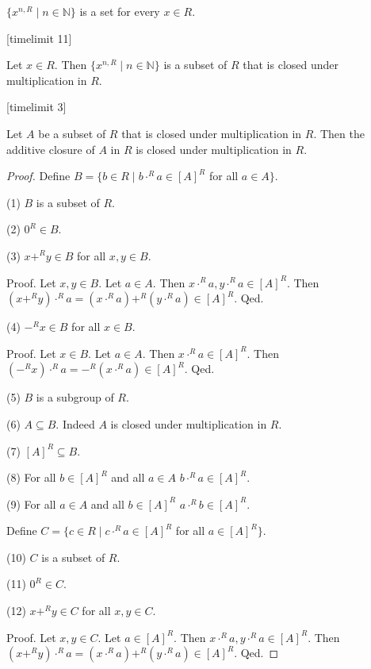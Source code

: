 \documentclass[english,11pt]{article}
\newcommand{\powers}[2]{\{{#1}^{n,#2} \mid n \in \mathbb{N}\}}
\begin{document}
\begin{forthel}
\begin{lemma} $\powers{x}{R}$ is a set for every $x \in R$.
\end{lemma}

[timelimit 11]
\begin{lemma} Let $x \in R$. Then
$\powers{x}{R}$ is a subset of $R$ that is closed under multiplication in $R$.
\end{lemma}
[timelimit 3]

\begin{lemma}
Let $A$ be a subset of $R$ that is closed under multiplication in $R$.
Then the additive closure of $A$ in $R$ is closed under multiplication in $R$.
\end{lemma}

\begin{proof}
Define $B = \{b \in R \mid b \cdot^{R} a \in [A]^{R}$ for all $a \in A\}$.

(1) $B$ is a subset of $R$.

(2) $0^{R} \in B$.

(3) $x +^{R} y \in B$ for all $x,y \in B$.

Proof.
Let $x,y \in B$.
Let $a \in A$. Then $x \cdot^{R} a, y \cdot^{R} a \in [A]^{R}$.
Then $(x +^{R} y) \cdot^{R} a = (x \cdot^{R} a) +^{R} (y \cdot^{R} a) \in [A]^{R}$.
Qed.

(4) $-^{R} x \in B$ for all $x \in B$.

Proof.
Let $x \in B$.
Let $a \in A$. Then $x \cdot^{R} a \in [A]^{R}$.
Then $(-^{R} x) \cdot^{R} a = -^{R} (x\cdot^{R} a) \in [A]^{R}$.
Qed.

(5) $B$ is a subgroup of $R$.

(6) $A \subseteq B$. Indeed $A$ is closed under multiplication in $R$.

(7) $[A]^{R} \subseteq B$.

(8) For all $b \in [A]^{R}$ and all $a \in A$ $b \cdot^{R} a \in [A]^{R}$.

(9) For all $a \in A$ and all $b \in [A]^{R}$  $a \cdot^{R} b \in [A]^{R}$.

Define $C = \{c \in R \mid c \cdot^{R} a \in [A]^{R}$ for all $a \in [A]^{R}\}$.

(10) $C$ is a subset of $R$.

(11) $0^{R} \in C$.

(12) $x +^{R} y \in C$ for all $x,y \in C$.

Proof.
Let $x,y \in C$.
Let $a \in [A]^{R}$. Then $x \cdot^{R} a, y \cdot^{R} a \in [A]^{R}$.
Then $(x +^{R} y) \cdot^{R} a = (x \cdot^{R} a) +^{R} (y \cdot^{R} a) \in [A]^{R}$.
Qed.


\end{proof}
\end{forthel}
\end{document}
